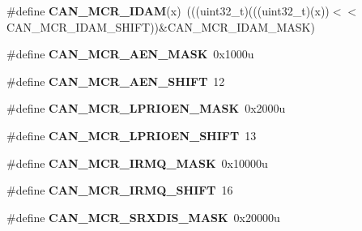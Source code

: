 \begin{DoxyCompactItemize}
\item 
\#define {\bfseries C\+A\+N\+\_\+\+M\+C\+R\+\_\+\+I\+D\+AM}(x)~(((uint32\+\_\+t)(((uint32\+\_\+t)(x))$<$$<$C\+A\+N\+\_\+\+M\+C\+R\+\_\+\+I\+D\+A\+M\+\_\+\+S\+H\+I\+FT))\&C\+A\+N\+\_\+\+M\+C\+R\+\_\+\+I\+D\+A\+M\+\_\+\+M\+A\+SK)\hypertarget{group__CAN__Register__Masks_ga864867bd7c0475f033af7efa7f021b07}{}\label{group__CAN__Register__Masks_ga864867bd7c0475f033af7efa7f021b07}

\item 
\#define {\bfseries C\+A\+N\+\_\+\+M\+C\+R\+\_\+\+A\+E\+N\+\_\+\+M\+A\+SK}~0x1000u\hypertarget{group__CAN__Register__Masks_gaf788111bd2bf9a69160d0a0cb713c926}{}\label{group__CAN__Register__Masks_gaf788111bd2bf9a69160d0a0cb713c926}

\item 
\#define {\bfseries C\+A\+N\+\_\+\+M\+C\+R\+\_\+\+A\+E\+N\+\_\+\+S\+H\+I\+FT}~12\hypertarget{group__CAN__Register__Masks_ga6c610bd65cb9471ad0ca511dbe2c86d4}{}\label{group__CAN__Register__Masks_ga6c610bd65cb9471ad0ca511dbe2c86d4}

\item 
\#define {\bfseries C\+A\+N\+\_\+\+M\+C\+R\+\_\+\+L\+P\+R\+I\+O\+E\+N\+\_\+\+M\+A\+SK}~0x2000u\hypertarget{group__CAN__Register__Masks_ga1420cc0cb40d414296a741397ee07116}{}\label{group__CAN__Register__Masks_ga1420cc0cb40d414296a741397ee07116}

\item 
\#define {\bfseries C\+A\+N\+\_\+\+M\+C\+R\+\_\+\+L\+P\+R\+I\+O\+E\+N\+\_\+\+S\+H\+I\+FT}~13\hypertarget{group__CAN__Register__Masks_gaaf89fabb5183062196edf8dc4a3f6770}{}\label{group__CAN__Register__Masks_gaaf89fabb5183062196edf8dc4a3f6770}

\item 
\#define {\bfseries C\+A\+N\+\_\+\+M\+C\+R\+\_\+\+I\+R\+M\+Q\+\_\+\+M\+A\+SK}~0x10000u\hypertarget{group__CAN__Register__Masks_gad68843c21c6243f255601d8973f4e7eb}{}\label{group__CAN__Register__Masks_gad68843c21c6243f255601d8973f4e7eb}

\item 
\#define {\bfseries C\+A\+N\+\_\+\+M\+C\+R\+\_\+\+I\+R\+M\+Q\+\_\+\+S\+H\+I\+FT}~16\hypertarget{group__CAN__Register__Masks_gae30b928fb3ce512c48cb0be04af69acd}{}\label{group__CAN__Register__Masks_gae30b928fb3ce512c48cb0be04af69acd}

\item 
\#define {\bfseries C\+A\+N\+\_\+\+M\+C\+R\+\_\+\+S\+R\+X\+D\+I\+S\+\_\+\+M\+A\+SK}~0x20000u\hypertarget{group__CAN__Register__Masks_ga29b3d428d19a7204c53f56c7467172f1}{}\label{group__CAN__Register__Masks_ga29b3d428d19a7204c53f56c7467172f1}


\end{DoxyCompactItemize}
